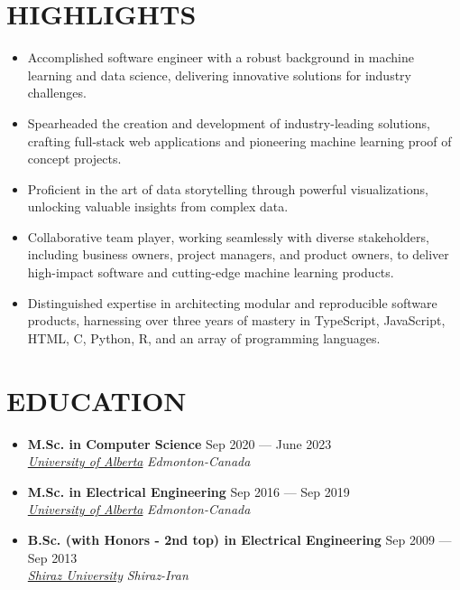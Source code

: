 \documentclass[10pt,letterpaper,roman]{moderncv} %
\begin{document}
	
	\makecvtitle
	
\vspace{-1cm}
    \section{HIGHLIGHTS}
	\begin{itemize}
		\item Accomplished software engineer with a robust background in machine learning and data science, delivering innovative solutions for industry challenges.
		
		\item Spearheaded the creation and development of industry-leading solutions, crafting full-stack web applications and pioneering machine learning proof of concept projects.
		
		\item Proficient in the art of data storytelling through powerful visualizations, unlocking valuable insights from complex data.
		
		\item Collaborative team player, working seamlessly with diverse stakeholders, including business owners, project managers, and product owners, to deliver high-impact software and cutting-edge machine learning products.
		
		\item Distinguished expertise in architecting modular and reproducible software products, harnessing over three years of mastery in TypeScript, JavaScript, HTML, C, Python, R, and an array of programming languages.
		
	\end{itemize}
	\section{EDUCATION}

	\begin{itemize}
		\item \textbf{M.Sc. in Computer Science} \hfill Sep 2020 --- June 2023 \\ 
		\href{https://ualberta.ca/}{ \emph{University of Alberta}} \hfill \emph{Edmonton-Canada}
		
		\item \textbf{M.Sc. in Electrical Engineering} \hfill Sep 2016 --- Sep 2019 \\ 
		\href{https://ualberta.ca/}{ \emph{University of Alberta}} \hfill \emph{Edmonton-Canada}
		
		\item \textbf{B.Sc. (with Honors - 2nd top) in Electrical Engineering} \hfill Sep 2009 --- Sep 2013 \\ 
		\href{https://ualberta.ca/}{ \emph{Shiraz University}} \hfill \emph{Shiraz-Iran}

	\end{itemize}
	
\end{document}

